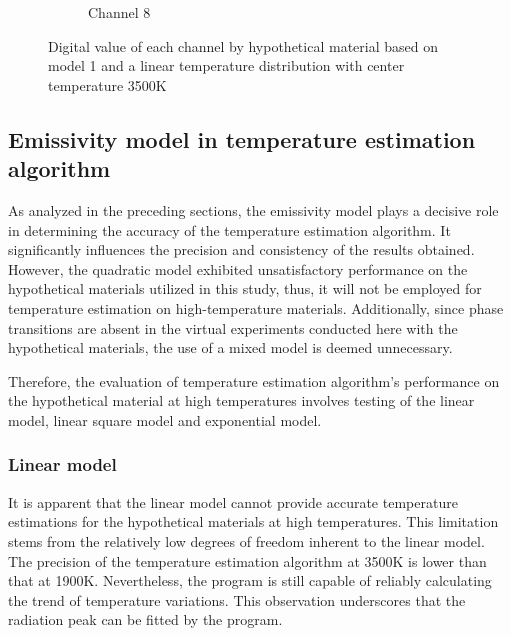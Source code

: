 \begin{figure}[htbp]
\begin{minipage}{0.87\textwidth}
\begin{subfigure}{0.23\textwidth}
            \caption{Channel 8}
        \end{subfigure}
    \end{minipage}
    \caption{Digital value of each channel by hypothetical material based on model 1
    and a linear temperature distribution with center temperature 3500K}
    \label{fig: channel_3500}
\end{figure}

\subsection{Emissivity model in temperature estimation algorithm}
As analyzed in the preceding sections, the emissivity model plays a decisive role in 
determining the accuracy of the temperature estimation algorithm. It significantly 
influences the precision and consistency of the results obtained. However, the quadratic 
model exhibited unsatisfactory performance on the hypothetical materials utilized in this study, 
thus, it will not be employed for temperature estimation on high-temperature materials. 
Additionally, since phase transitions are absent in the virtual experiments conducted here 
with the hypothetical materials, the use of a mixed model is deemed unnecessary.


Therefore, the evaluation of temperature estimation algorithm's performance 
on the hypothetical material at high temperatures involves testing of the linear model, 
linear square model and exponential model.

\subsubsection{Linear model}
It is apparent that the linear model cannot provide accurate temperature estimations 
for the hypothetical materials at high temperatures. This limitation stems from the 
relatively low degrees of freedom inherent to the linear model. The precision of the 
temperature estimation algorithm at 3500K is lower than that at 1900K. Nevertheless, 
the program is still capable of reliably calculating the trend of temperature variations. 
This observation underscores that the radiation peak can be fitted by the 
program.


